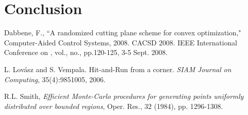\documentclass[11pt]{article}
\begin{document}
\section{Conclusion}

\pagebreak

\begin{thebibliography}{99}

 Dabbene, F., ``A randomized cutting plane scheme for convex optimization," Computer-Aided Control Systems, 2008. CACSD 2008. IEEE International Conference on , vol., no., pp.120-125, 3-5 Sept. 2008.

 L. Lov\'asz and S. Vempala. Hit-and-Run from a corner. \emph{SIAM Journal on Computing}, 35(4):9851005, 2006.

 R.L. Smith, \emph{Efficient Monte-Carlo procedures for generating points uniformly distributed over
bounded regions}, Oper. Res., 32 (1984), pp. 1296-1308.

\end{thebibliography}
\end{document}

